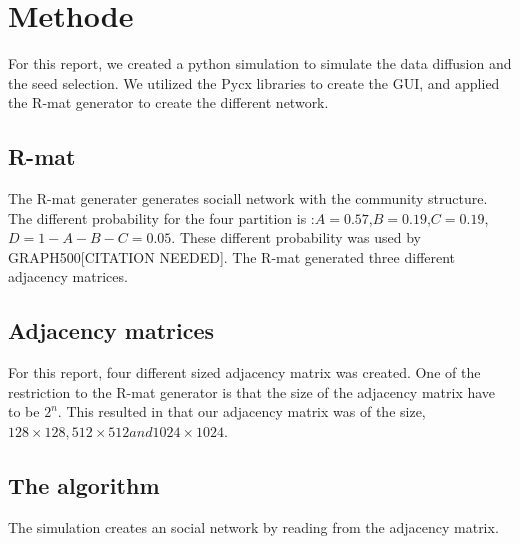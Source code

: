\chapter{Methode}
For this report, we created a python simulation to simulate the data diffusion and the seed selection. We utilized the Pycx libraries to create the GUI, and applied the R-mat generator to create the different network.

\section{R-mat}
The R-mat generater generates sociall network with the community structure. The different probability for the four partition is :$A=0.57$,$B=0.19$,$C=0.19$,$D = 1-A-B-C = 0.05$. These different probability was used by GRAPH500[CITATION NEEDED]. The R-mat generated three different adjacency matrices.

\section{Adjacency matrices}
For this report, four different sized adjacency matrix was created. One of the restriction to the R-mat generator is that the size of the adjacency matrix have to be $2^n$. This resulted in that our adjacency matrix was of the size, $128 \times 128, 512 \times 512 and 1024 \times 1024$.  

\section{The algorithm}
The simulation creates an social network by reading from the adjacency matrix. 
